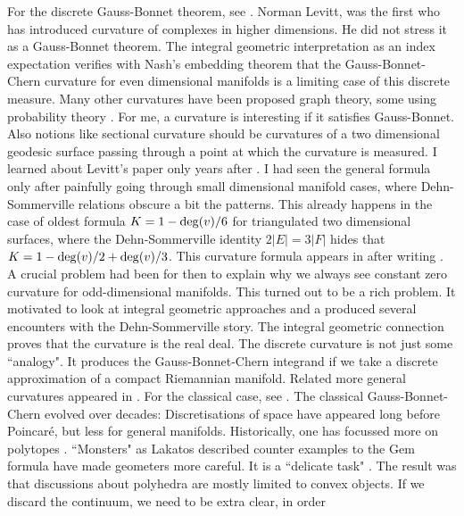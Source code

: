 \documentclass[12pt]{amsart}
\begin{document}
For the discrete Gauss-Bonnet theorem, see \cite{Eberhard1891,Levitt1992,elemente11,dehnsommervillegaussbonnet,
cherngaussbonnet,valuation,DehnSommerville}. Norman Levitt, was the first who has introduced curvature of complexes
in higher dimensions. He did not stress it as a Gauss-Bonnet theorem. The integral geometric interpretation as
an index expectation verifies with Nash's embedding theorem that the Gauss-Bonnet-Chern curvature for even 
dimensional manifolds is a limiting case of this discrete measure. Many other curvatures have been proposed
graph theory, some using probability theory \cite{Ollivier,JostLiu}. For me, a curvature is interesting if it 
satisfies Gauss-Bonnet. Also notions like sectional curvature should 
be curvatures of a two dimensional geodesic surface passing through a point at which the curvature is measured.
I learned about Levitt's paper only years after \cite{cherngaussbonnet}. I had seen the general formula only after
painfully going through small dimensional manifold cases, where Dehn-Sommerville relations obscure
a bit the patterns. This already happens in the case of oldest formula $K=1-{\rm deg}(v)/6$ for triangulated
two dimensional surfaces, where the Dehn-Sommerville identity $2|E|=3|F|$ hides that $K=1-{\rm deg}(v)/2+{\rm deg}(v)/3$. 
This curvature formula appears in \cite{princetonguide} after writing \cite{elemente11}.
A crucial problem had been for then to explain why we always see constant zero curvature 
for odd-dimensional manifolds. This turned out to be a rich problem. It motivated 
to look at integral geometric approaches and a produced several encounters with the Dehn-Sommerville story.
The integral geometric connection proves that the curvature is the real deal. 
The discrete curvature is not just some ``analogy".  It produces the Gauss-Bonnet-Chern integrand if we 
take a discrete approximation of a compact Riemannian manifold. 
Related more general curvatures appeared in \cite{Higuchi,FormCurvatures}.
For the classical case, see \cite{Wu2007}. The classical Gauss-Bonnet-Chern evolved over decades:
\cite{HopfCurvaturaIntegra,Allendoerfer,Fenchel,AllendoerferWeil,Chern44,chern1990,Cycon}
Discretisations of space have appeared long before Poincar\'e, but less for general manifolds. Historically,
one has focussed more on polytopes \cite{Ziegler,gruenbaum}. ``Monsters" as Lakatos described counter examples
to the Gem formula have made geometers more careful.  It is a ``delicate task" \cite{Devadoss}.
The result was that discussions about polyhedra are
mostly limited to convex objects. If we discard the continuum, we need to be extra clear, in order
\end{document}
